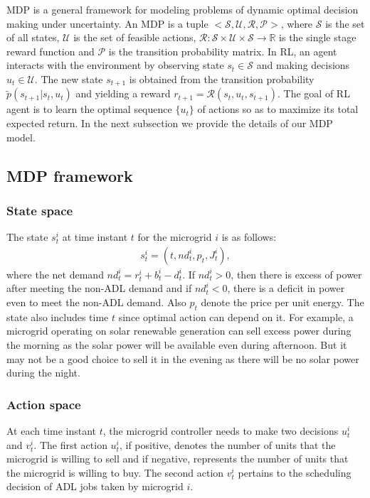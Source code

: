 MDP is a general framework for modeling problems of dynamic optimal decision making under uncertainty. An MDP is a tuple $<\mathcal{S},\mathcal{U},\mathcal{R},\mathcal{P}>$, where $\mathcal{S}$ is the set of all states, $\mathcal{U}$ is the set of  feasible actions, $\mathcal{R}:\mathcal{S}\times\mathcal{U}\times\mathcal{S}\to \mathbb{R} $ is the single stage reward function and $\mathcal{P}$ is the transition probability matrix. In RL, an agent interacts with the environment by observing state $s_t \in \mathcal{S}$ and  making decisions $u_t \in \mathcal{U}$. The new state $s_{t+1}$ is obtained from the transition probability $ \tilde p(s_{t+1} | s_t,u_t)$ and yielding a reward $r_{t+1} = \mathcal{R}(s_t,u_t,s_{t+1})$. The goal of  RL agent is to learn the optimal sequence $\{u_t\}$ of actions so as to maximize its total expected return.
 In the next subsection we provide the details of our MDP model.
\subsection{MDP framework}
\subsubsection{State space}
The state $s_{t}^{i}$ at time instant $t$  for the microgrid $i$ is as follows:
\begin{align}
s_{t}^{i} = (t,nd_{t}^{i},p_{t}, J_{t}^{i}),
\end{align}
where the net demand $nd_{t}^{i} = r_{t}^{i} + b_{t}^{i} - d_{t}^{i}$.
If $nd_{t}^{i} > 0$, then  there is excess of power after meeting the non-ADL demand and if $nd_{t}^{i} < 0$, there is a deficit in power even to meet the non-ADL demand. Also $p_{t}$ denote the price per unit energy. The state also includes time $t$ since optimal action can depend on it. For example, a microgrid operating on solar renewable generation can sell excess power during the morning as the solar power will be available even during afternoon. But it may not be a good choice to sell it in the evening as there will be no solar power during the night. 
\subsubsection{Action space}
At each time instant $t$, the microgrid controller needs to make two decisions $u_{t}^{i}$ and $v_{t}^{i}$. The first action $u_{t}^{i}$, if positive, denotes the number of units that the microgrid is willing to sell and if negative, represents the number of units that the microgrid is willing to buy. The second action $v_{t}^{i}$ pertains to the scheduling decision of ADL jobs taken by microgrid $i$.

